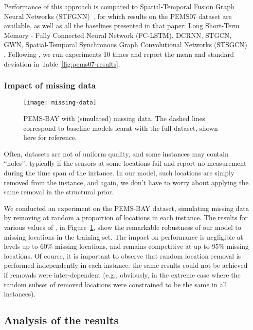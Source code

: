 \documentclass[a4paper]{article}
\begin{document}
Performance of this approach is compared to Spatial-Temporal Fusion Graph Neural Networks (STFGNN)~\cite{li_spatial-temporal_2021}, for which results on the PEMS07 dataset are available, as well as all the baselines presented in that paper: Long Short-Term Memory - Fully Connected Neural Network (FC-LSTM), DCRNN, STGCN, GWN, Spatial-Temporal Synchronous Graph Convolutional Networks (STSGCN) \cite{song_spatial-temporal_2020}. Following \cite{li_spatial-temporal_2021}, we run experiments 10 times and report the mean and standard deviation in Table~\ref{fig:pems07-results}.
\subsubsection{Impact of missing data}
\begin{figure}
\begin{center}
\texttt{[image: missing-data]}
\end{center}
\caption{\label{fig:missing-data}PEMS-BAY with (simulated) missing data. The dashed lines correspond to baseline models learnt with the full dataset, shown here for reference.}
\end{figure}
Often, datasets are not of uniform quality, and some instances may contain ``holes'', typically if the sensors at some locations fail and report no measurement during the time span of the instance. In our model, such locations are simply removed from the instance, and again, we don't have to worry about applying the same removal in the structural prior.

We conducted an experiment on the PEMS-BAY dataset, simulating missing data by removing at random a proportion  of locations in each instance. The results for various values of , in Figure~\ref{fig:missing-data}, show the remarkable robustness of our model to missing locations in the training set. The impact on performance is negligible at levels up to 60\% missing locations, and remains competitive at up to 95\% missing locations. Of course, it is important to observe that random location removal is performed independently in each instance: the same results could not be achieved if removals were inter-dependent (e.g., obviously, in the extreme case where the random subset of removed locations were constrained to be the same in all instances).
\subsection{Analysis of the results}
\end{document}
